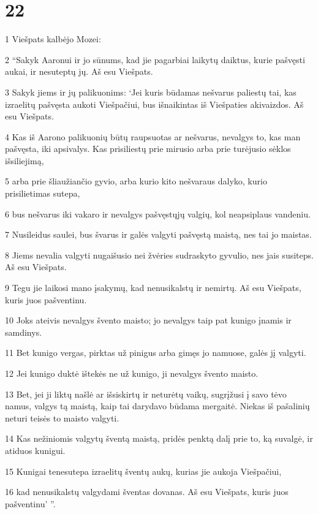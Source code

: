 \chapter{22}

\par 1 Viešpats kalbėjo Mozei: 
\par 2 “Sakyk Aaronui ir jo sūnums, kad jie pagarbiai laikytų daiktus, kurie pašvęsti aukai, ir nesuteptų jų. Aš esu Viešpats. 
\par 3 Sakyk jiems ir jų palikuonims: ‘Jei kuris būdamas nešvarus paliestų tai, kas izraelitų pašvęsta aukoti Viešpačiui, bus išnaikintas iš Viešpaties akivaizdos. Aš esu Viešpats. 
\par 4 Kas iš Aarono palikuonių būtų raupsuotas ar nešvarus, nevalgys to, kas man pašvęsta, iki apsivalys. Kas prisiliestų prie mirusio arba prie turėjusio sėklos išsiliejimą, 
\par 5 arba prie šliaužiančio gyvio, arba kurio kito nešvaraus dalyko, kurio prisilietimas sutepa, 
\par 6 bus nešvarus iki vakaro ir nevalgys pašvęstųjų valgių, kol neapsiplaus vandeniu. 
\par 7 Nusileidus saulei, bus švarus ir galės valgyti pašvęstą maistą, nes tai jo maistas. 
\par 8 Jiems nevalia valgyti nugaišusio nei žvėries sudraskyto gyvulio, nes jais susiteps. Aš esu Viešpats. 
\par 9 Tegu jie laikosi mano įsakymų, kad nenusikalstų ir nemirtų. Aš esu Viešpats, kuris juos pašventinu. 
\par 10 Joks ateivis nevalgys švento maisto; jo nevalgys taip pat kunigo įnamis ir samdinys. 
\par 11 Bet kunigo vergas, pirktas už pinigus arba gimęs jo namuose, galės jį valgyti. 
\par 12 Jei kunigo duktė ištekės ne už kunigo, ji nevalgys švento maisto. 
\par 13 Bet, jei ji liktų našlė ar išsiskirtų ir neturėtų vaikų, sugrįžusi į savo tėvo namus, valgys tą maistą, kaip tai darydavo būdama mergaitė. Niekas iš pašalinių neturi teisės to maisto valgyti. 
\par 14 Kas nežiniomis valgytų šventą maistą, pridės penktą dalį prie to, ką suvalgė, ir atiduos kunigui. 
\par 15 Kunigai tenesutepa izraelitų šventų aukų, kurias jie aukoja Viešpačiui, 
\par 16 kad nenusikalstų valgydami šventas dovanas. Aš esu Viešpats, kuris juos pašventinu’ ”. 
